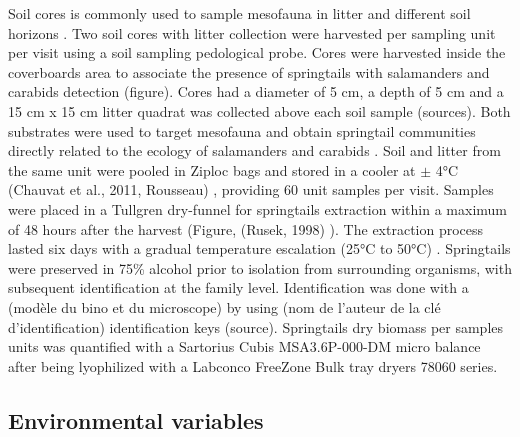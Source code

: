 Soil cores is commonly used to sample mesofauna in litter and different soil horizons \citep{chauvatChangesSoilFaunal2011a,farskaManagementIntensityAffects2014,pongeVerticalDistributionCollembola2000,salamonEffectsPlantDiversity2004,wuCompositionSpatiotemporalVariation2014}. 
Two soil cores with litter collection were harvested per sampling unit per visit using a soil sampling pedological probe. 
Cores were harvested inside the coverboards area to associate the presence of springtails with salamanders and carabids detection (figure). 
Cores had a diameter of 5 cm, a depth of 5 cm and a 15 cm x 15 cm litter quadrat was collected above each soil sample (sources).
Both substrates were used to target mesofauna and obtain springtail communities directly related to the ecology of salamanders and carabids \citep{chauvatChangesSoilFaunal2011a,edwardsAssessmentPopulationsSoilinhabiting1991,raymond-leonardSpringtailCommunityStructure2018a,rousseauForestFloorMesofauna2018}.
Soil and litter from the same unit were pooled in Ziploc bags and stored in a cooler at $\pm$ 4°C (Chauvat et al., 2011, Rousseau) \citep{chauvatChangesSoilFaunal2011a,rousseauForestFloorMesofauna2018}, providing 60 unit samples per visit.
Samples were placed in a Tullgren dry-funnel for springtails extraction within a maximum of 48 hours after the harvest (Figure, (Rusek, 1998) \citealp{rousseauForestFloorMesofauna2018,wuCompositionSpatiotemporalVariation2014}). 
The extraction process lasted six days with a gradual temperature escalation (25°C to 50°C) \citep{raymond-leonardSpringtailCommunityStructure2018a}.
Springtails were preserved in 75\% alcohol \citep{wuCompositionSpatiotemporalVariation2014} prior to isolation from surrounding organisms, with subsequent identification at the family level.
Identification was done with a (modèle du bino et du microscope) by using (nom de l'auteur de la clé d'identification) identification keys (source).
Springtails dry biomass per samples units was quantified with a Sartorius Cubis MSA3.6P-000-DM micro balance after being lyophilized with a Labconco FreeZone Bulk tray dryers 78060 series.




\subsection*{Environmental variables}
\label{subsec:EnvVar}

